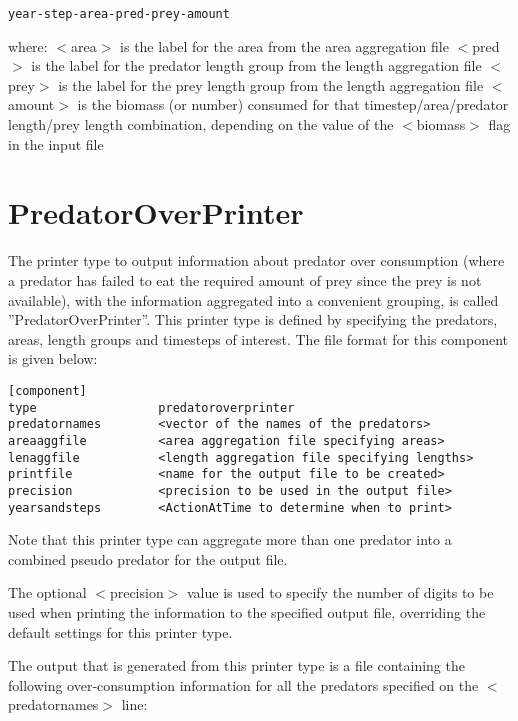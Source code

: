 \documentclass[10pt,twoside]{book}
\begin{document}
{\small\begin{verbatim}
year-step-area-pred-prey-amount
\end{verbatim}}

where:\newline
$<$area$>$ is the label for the area from the area aggregation file\newline
$<$pred$>$ is the label for the predator length group from the length aggregation file\newline
$<$prey$>$ is the label for the prey length group from the length aggregation file\newline
$<$amount$>$ is the biomass (or number) consumed for that timestep/area/predator length/prey length combination, depending on the value of the $<$biomass$>$ flag in the input file

\section{PredatorOverPrinter}\label{sec:predatoroverprinter}
The printer type to output information about predator over consumption (where a predator has failed to eat the required amount of prey since the prey is not available), with the information aggregated into a convenient grouping, is called ''PredatorOverPrinter''.  This printer type is defined by specifying the predators, areas, length groups and timesteps of interest.  The file format for this component is given below:

{\small\begin{verbatim}
[component]
type                 predatoroverprinter
predatornames        <vector of the names of the predators>
areaaggfile          <area aggregation file specifying areas>
lenaggfile           <length aggregation file specifying lengths>
printfile            <name for the output file to be created>
precision            <precision to be used in the output file>
yearsandsteps        <ActionAtTime to determine when to print>
\end{verbatim}}

Note that this printer type can aggregate more than one predator into a combined pseudo predator for the output file.

\bigskip
The optional $<$precision$>$ value is used to specify the number of digits to be used when printing the information to the specified output file, overriding the default settings for this printer type.

\bigskip
The output that is generated from this printer type is a file containing the following over-consumption information for all the predators specified on the $<$predatornames$>$ line:
\end{document}
